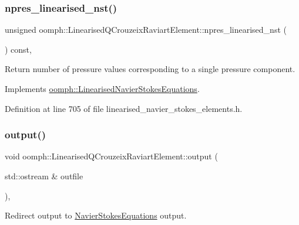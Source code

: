 \subsubsection{\texorpdfstring{npres\+\_\+linearised\+\_\+nst()}{npres\_linearised\_nst()}}
{\footnotesize\ttfamily unsigned oomph\+::\+Linearised\+Q\+Crouzeix\+Raviart\+Element\+::npres\+\_\+linearised\+\_\+nst (\begin{DoxyParamCaption}{ }\end{DoxyParamCaption}) const\hspace{0.3cm}{\ttfamily [inline]}, {\ttfamily [virtual]}}



Return number of pressure values corresponding to a single pressure component. 



Implements \hyperlink{classoomph_1_1LinearisedNavierStokesEquations_a2dbceef603d7e72bd709643107d2e975}{oomph\+::\+Linearised\+Navier\+Stokes\+Equations}.



Definition at line 705 of file linearised\+\_\+navier\+\_\+stokes\+\_\+elements.\+h.

\mbox{\label{classoomph_1_1LinearisedQCrouzeixRaviartElement_a160a7f873347a58ca86ee24a68725e27}} 
\subsubsection{\texorpdfstring{output()}{output()}\hspace{0.1cm}{\footnotesize\ttfamily [1/4]}}
{\footnotesize\ttfamily void oomph\+::\+Linearised\+Q\+Crouzeix\+Raviart\+Element\+::output (\begin{DoxyParamCaption}\item[{std\+::ostream \&}]{outfile }\end{DoxyParamCaption})\hspace{0.3cm}{\ttfamily [inline]}, {\ttfamily [virtual]}}



Redirect output to \hyperlink{classoomph_1_1NavierStokesEquations}{Navier\+Stokes\+Equations} output. 



